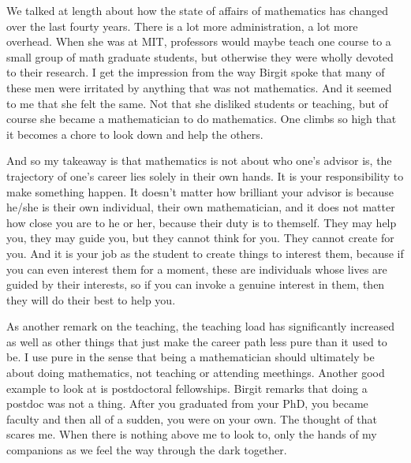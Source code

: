 \documentclass[12pt]{article}
\begin{document}
\hfill

We talked at length about how the state of affairs of mathematics has changed over the last fourty years. There is a lot more administration, a lot more overhead.
When she was at MIT, professors would maybe teach one course to a small group of math graduate students, but otherwise they were wholly devoted to their research.
I get the impression from the way Birgit spoke that many of these men were irritated by anything
that was not mathematics. And it seemed to me that she felt the same. Not that she disliked students or teaching, but of course she became a mathematician to 
do mathematics. One climbs so high that it becomes a chore to look down and help the others.

\hfill

And so my takeaway is that mathematics is not about who one's advisor is, the trajectory of one's career lies solely in their own hands. It is your responsibility to make something happen.
It doesn't matter how brilliant your advisor is because he/she is their own individual, their own mathematician, and it does not matter how close you are to he or her, because their duty is to themself.
They may help you, they may guide you, but they cannot think for you. They cannot create for you. And it is your job as the student to create things to interest them, because if you
can even interest them for a moment, these are individuals whose lives are guided by their interests, so if you can invoke a genuine interest in them, then they will do their best to help you.

\hfill

As another remark on the teaching, the teaching load has significantly increased as well as other things that just make the career path less pure 
than it used to be. I use pure in the sense that being a mathematician should ultimately be about doing mathematics, not teaching or attending meethings.
Another good example to look at is postdoctoral fellowships. Birgit remarks that doing a postdoc was not a thing. After you graduated from your PhD,
you became faculty and then all of a sudden, you were on your own. The thought of that scares me. When there is nothing above me to look to, only 
the hands of my companions as we feel the way through the dark together.


\hfill
\end{document}

